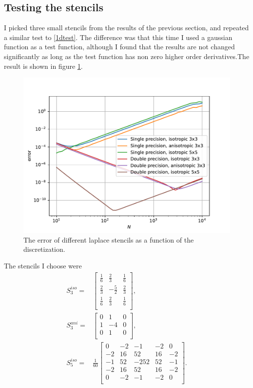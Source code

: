 \documentclass[pdftex,12pt,a4paper]{article}
\begin{document}
	\subsection{Testing the stencils}
		I picked three small stencils from the results of the previous section, and repeated a similar test to \ref{1dtest}. The difference was that this time I used a gaussian function as a test function, although I found that the results are not changed significantly as long as the test function has non zero higher order derivatives.The result is shown in figure \ref{2dpdf}.
		\begin{figure}[H]
			\centering
			\includegraphics[scale=1]{./figs/2d.pdf}
			\caption{The error of different laplace stencils as a function of the discretization.}
			\label{2dpdf}
		\end{figure}
		The stencils I choose were
		\begin{equation}
			\begin{aligned}
			S_3^{iso} =& 
				\begin{bmatrix}
					\frac{1}{6} & \frac{2}{3} & \frac{1}{6}\\
					\frac{2}{3} & -\frac{5}{2} & \frac{2}{3}\\
					\frac{1}{6} & \frac{2}{3} & \frac{1}{6}\\
				\end{bmatrix},\\
			S_3^{ani} =&
				\begin{bmatrix}
					0 & 1 & 0\\
					1 & -4 & 0\\
					0 & 1 & 0\\
				\end{bmatrix},\\
			S_5^{iso} =& \frac{1}{60}
				\begin{bmatrix}
					0 & -2 & -1 & -2 & 0\\
					-2 & 16 & 52 & 16 & -2\\
					-1 & 52 & -252 & 52 & -1\\
					-2 & 16 & 52 & 16 & -2\\
					0 & -2 & -1 & -2 & 0\\
				\end{bmatrix}.\\
			\end{aligned}
		\end{equation}
\end{document}
